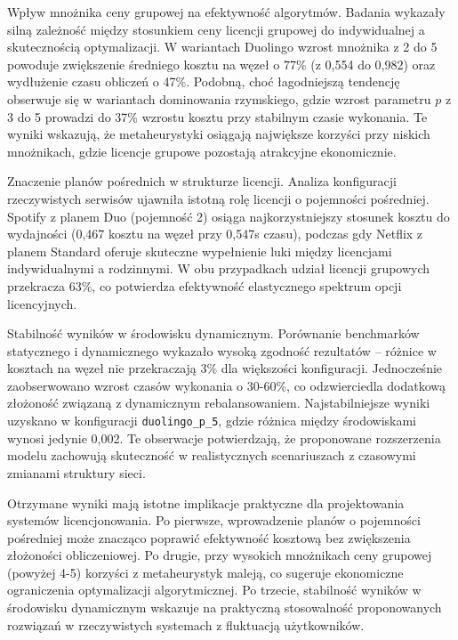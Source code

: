 Wpływ mnożnika ceny grupowej na efektywność algorytmów. Badania wykazały silną zależność między stosunkiem ceny licencji grupowej do indywidualnej a skutecznością optymalizacji. W wariantach Duolingo wzrost mnożnika z 2 do 5 powoduje zwiększenie średniego kosztu na węzeł o 77\% (z 0,554 do 0,982) oraz wydłużenie czasu obliczeń o 47\%. Podobną, choć łagodniejszą tendencję obserwuje się w wariantach dominowania rzymskiego, gdzie wzrost parametru $p$ z 3 do 5 prowadzi do 37\% wzrostu kosztu przy stabilnym czasie wykonania. Te wyniki wskazują, że metaheurystyki osiągają największe korzyści przy niskich mnożnikach, gdzie licencje grupowe pozostają atrakcyjne ekonomicznie.

Znaczenie planów pośrednich w strukturze licencji. Analiza konfiguracji rzeczywistych serwisów ujawniła istotną rolę licencji o pojemności pośredniej. Spotify z planem Duo (pojemność 2) osiąga najkorzystniejszy stosunek kosztu do wydajności (0,467 kosztu na węzeł przy 0,547s czasu), podczas gdy Netflix z planem Standard oferuje skuteczne wypełnienie luki między licencjami indywidualnymi a rodzinnymi. W obu przypadkach udział licencji grupowych przekracza 63\%, co potwierdza efektywność elastycznego spektrum opcji licencyjnych.

Stabilność wyników w środowisku dynamicznym. Porównanie benchmarków statycznego i dynamicznego wykazało wysoką zgodność rezultatów -- różnice w kosztach na węzeł nie przekraczają 3\% dla większości konfiguracji. Jednocześnie zaobserwowano wzrost czasów wykonania o 30-60\%, co odzwierciedla dodatkową złożoność związaną z dynamicznym rebalansowaniem. Najstabilniejsze wyniki uzyskano w konfiguracji \texttt{duolingo\_p\_5}, gdzie różnica między środowiskami wynosi jedynie 0,002. Te obserwacje potwierdzają, że proponowane rozszerzenia modelu zachowują skuteczność w realistycznych scenariuszach z czasowymi zmianami struktury sieci.

Otrzymane wyniki mają istotne implikacje praktyczne dla projektowania systemów licencjonowania. Po pierwsze, wprowadzenie planów o pojemności pośredniej może znacząco poprawić efektywność kosztową bez zwiększenia złożoności obliczeniowej. Po drugie, przy wysokich mnożnikach ceny grupowej (powyżej 4-5) korzyści z metaheurystyk maleją, co sugeruje ekonomiczne ograniczenia optymalizacji algorytmicznej. Po trzecie, stabilność wyników w środowisku dynamicznym wskazuje na praktyczną stosowalność proponowanych rozwiązań w rzeczywistych systemach z fluktuacją użytkowników.
